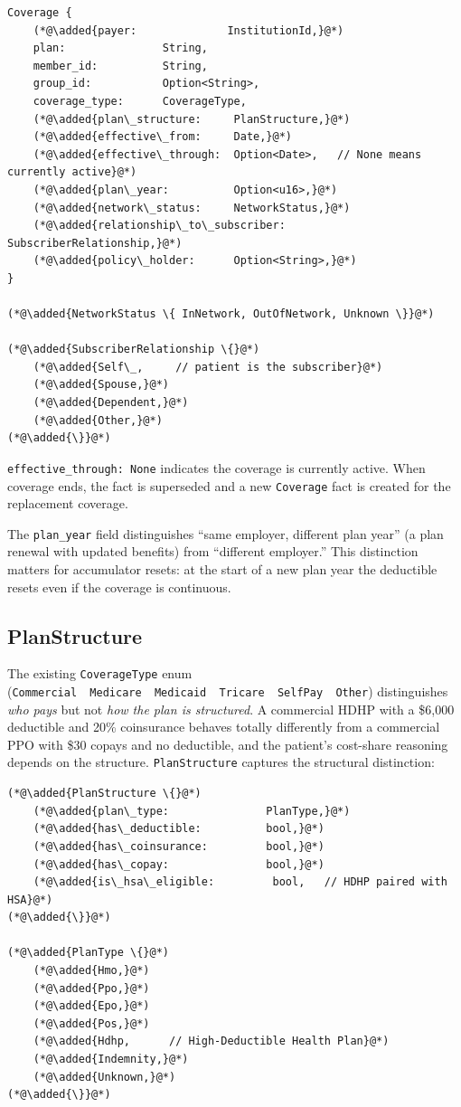 \documentclass[11pt]{article}
\newcommand{\added}[1]{\textcolor{accentblue}{#1}}
\begin{document}
\begin{lstlisting}
Coverage {
    (*@\added{payer:              InstitutionId,}@*)
    plan:               String,
    member_id:          String,
    group_id:           Option<String>,
    coverage_type:      CoverageType,
    (*@\added{plan\_structure:     PlanStructure,}@*)
    (*@\added{effective\_from:     Date,}@*)
    (*@\added{effective\_through:  Option<Date>,   // None means currently active}@*)
    (*@\added{plan\_year:          Option<u16>,}@*)
    (*@\added{network\_status:     NetworkStatus,}@*)
    (*@\added{relationship\_to\_subscriber: SubscriberRelationship,}@*)
    (*@\added{policy\_holder:      Option<String>,}@*)
}

(*@\added{NetworkStatus \{ InNetwork, OutOfNetwork, Unknown \}}@*)

(*@\added{SubscriberRelationship \{}@*)
    (*@\added{Self\_,     // patient is the subscriber}@*)
    (*@\added{Spouse,}@*)
    (*@\added{Dependent,}@*)
    (*@\added{Other,}@*)
(*@\added{\}}@*)
\end{lstlisting}

\texttt{effective\_through: None} indicates the coverage is currently
active. When coverage ends, the fact is superseded and a new
\texttt{Coverage} fact is created for the replacement coverage.

The \texttt{plan\_year} field distinguishes ``same employer, different
plan year'' (a plan renewal with updated benefits) from ``different
employer.'' This distinction matters for accumulator resets: at the
start of a new plan year the deductible resets even if the coverage is
continuous.

\subsection{PlanStructure}
\label{sec:plan-structure}

The existing \texttt{CoverageType} enum
(\texttt{Commercial\ \textbar{}\ Medicare\ \textbar{}\ Medicaid\ \textbar{}\ Tricare\ \textbar{}\ SelfPay\ \textbar{}\ Other})
distinguishes \emph{who pays} but not \emph{how the plan is
structured}. A commercial HDHP with a \$6{,}000 deductible and 20\%
coinsurance behaves totally differently from a commercial PPO with
\$30 copays and no deductible, and the patient's cost-share reasoning
depends on the structure. \texttt{PlanStructure} captures the
structural distinction:

\begin{lstlisting}
(*@\added{PlanStructure \{}@*)
    (*@\added{plan\_type:               PlanType,}@*)
    (*@\added{has\_deductible:          bool,}@*)
    (*@\added{has\_coinsurance:         bool,}@*)
    (*@\added{has\_copay:               bool,}@*)
    (*@\added{is\_hsa\_eligible:         bool,   // HDHP paired with HSA}@*)
(*@\added{\}}@*)

(*@\added{PlanType \{}@*)
    (*@\added{Hmo,}@*)
    (*@\added{Ppo,}@*)
    (*@\added{Epo,}@*)
    (*@\added{Pos,}@*)
    (*@\added{Hdhp,      // High-Deductible Health Plan}@*)
    (*@\added{Indemnity,}@*)
    (*@\added{Unknown,}@*)
(*@\added{\}}@*)
\end{lstlisting}
\end{document}
